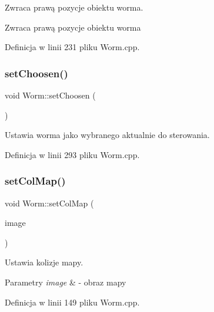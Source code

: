 Zwraca prawą pozycje obiektu worma. 

\begin{DoxyReturn}{Zwraca}
prawą pozycje obiektu worma 
\end{DoxyReturn}


Definicja w linii 231 pliku Worm.\+cpp.

\mbox{\label{class_worm_ac5daf6e0926f483415886c5ae297714a}} 
\subsubsection{\texorpdfstring{set\+Choosen()}{setChoosen()}}
{\footnotesize\ttfamily void Worm\+::set\+Choosen (\begin{DoxyParamCaption}{ }\end{DoxyParamCaption})}



Ustawia worma jako wybranego aktualnie do sterowania. 



Definicja w linii 293 pliku Worm.\+cpp.

\mbox{\label{class_worm_af851e558c46b33b245b96a43bb2e5c56}} 
\subsubsection{\texorpdfstring{set\+Col\+Map()}{setColMap()}}
{\footnotesize\ttfamily void Worm\+::set\+Col\+Map (\begin{DoxyParamCaption}\item[{sf\+::\+Image $\ast$}]{image }\end{DoxyParamCaption})}



Ustawia kolizje mapy. 


\begin{DoxyParams}{Parametry}
{\em image} & -\/ obraz mapy \\
\hline
\end{DoxyParams}


Definicja w linii 149 pliku Worm.\+cpp.

\mbox{\label{class_worm_ab316cd13ecdfe9696e28687bfce47a4c}} 
